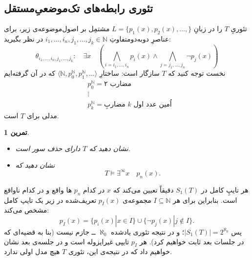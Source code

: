 \documentclass[12pt,a4paper]{report}
\theoremstyle{colorhead}
\newtheorem{tam}[thm]{تمرین}
\begin{document}
\subsection{تئوری رابطه‌های تک‌موضعیِ‌مستقل}
تئوریِ
$T$
را در زبانِ
$L=\{p_1(x),p_2(x),\ldots,\}$
مشتمِل بر اصول‌موضوعه‌ی زیر، برای عناصرِ دوبه‌دومتفاوتِ
$i_1,\ldots,i_n, j_1,\ldots,j_k\in \mathbb{N}$
در نظر بگیرید:
\[
\theta_{i_1,\ldots,i_n,j_1,\ldots,j_k}:\quad \exists x\quad \left( \bigwedge_{i=i_1,\ldots,i_n} p_i(x) \wedge \bigwedge_{j=j_1,\ldots, j_n} \neg p_j(x)\right)
\]
نخست توجه کنید که
$T$
سازگار است: ساختارِ
$\langle \mathbb{N}, p_0^\mathbb{N},p_1^\mathbb{N},\ldots\rangle$
که در آن گرفته‌ایم
\begin{align*}
& p_0^\mathbb{N}=\text{مضارب ۲}
\\
& 
\vdots \\
& 
p_k^\mathbb{N}=\text{مضاربِ $k$ اُمین عدد اول}
\end{align*}
مدلی برای
$T$
است. 
\begin{tam}\hfill 
\begin{itemize}
\item 
نشان دهید که
$T$
دارای حذف سور است.
\item 
نشان دهید که 
\[
T\models \exists^{\infty } x\quad  p_n(x).
\]
\end{itemize}
\end{tam}
هر تایپِ کامل در
$S_1(T)$
دقیقاً تعیین می‌کند که 
$x$
در کدام
$p_n$
ها
واقع و در کدام ناواقع است. بنابراین برای هر
$I\subseteq \mathbb{N}$
مجموعه‌ی
$p_I(x)$
تعریف‌شده در زیر یک تایپ کامل مشخص می‌کند:
\[
p_I(x)=\{p_i(x)|x\in I\} \cup \{\neg p_j(x)|j\not\in I\}.
\]
پس
$|S_1(T)|=2^{\aleph_0}$؛
و در نتیجه تئوری یادشده 
$\aleph_0$ ــ
جازم نیست (بنا به قضیه‌ای که در جلسات بعد ثابت خواهیم کرد).
هر
$p_I$
تایپی غیرایزوله است و در جلسه‌ی بعد نشان خواهیم داد که در نتیجه‌ی
این، تئوری
$T$
هیچ مدل اولی ندارد. 
\end{document}
